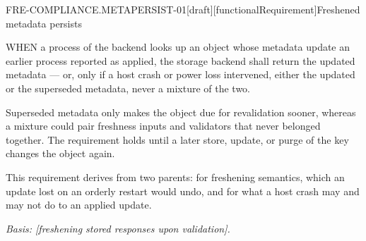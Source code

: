 \begin{requirement}{FRE-COMPLIANCE.METAPERSIST-01}[draft][functionalRequirement]{Freshened metadata persists}


  WHEN a process of the backend looks up an object whose metadata update an
  earlier process reported as applied, the storage backend shall return the
  updated metadata --- or, only if a host crash or power loss intervened,
  either the updated or the superseded metadata, never a mixture of the two.

  Superseded metadata only makes the object due for revalidation sooner,
  whereas a mixture could pair freshness inputs and validators that never
  belonged together. The requirement holds until a later store, update, or
  purge of the key changes the object again.

  This requirement derives from two parents: 
  for freshening semantics, which an update lost on an orderly restart would
  undo, and  for what a host crash may
  and may not do to an applied update.

  \textit{Basis: [freshening stored responses upon
  validation].}



\end{requirement}

